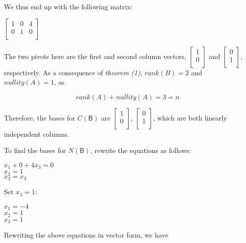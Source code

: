 \documentclass[a4paper, 11pt]{article}
\newcommand{\mat}[1]{\boldsymbol { \mathsf{#1}} }
\begin{document}
\begin{enumerate}
We thus end up with the following matrix:

\begin{center}
	$
	\begin{bmatrix}
	1 & 0 & 4 \\
	0 & 1 & 0 \\
	\end{bmatrix}
	$
\end{center}

The two pivots here are the first and second column vectors, $\begin{bmatrix}
1 \\
0 \\
\end{bmatrix}$ and $\begin{bmatrix}
0 \\
1 \\
\end{bmatrix}$, respectively. As a consequence of \textit{theorem (1)}, $rank(B) = 2$ and $nullity(A) = 1$, as 

\begin{equation*}
    rank(A) + nullity(A) = 3 = n
\end{equation*}

Therefore, the bases for $C(\mat{B})$ are $\begin{bmatrix}
1 \\
0 \\
\end{bmatrix}$, $\begin{bmatrix}
0 \\
1 \\
\end{bmatrix}$, which are both linearly independent columns.

To find the bases for $N(\mat{B})$, rewrite the equations as follows:
\begin{center}
    $x_1 + 0 + 4x_3 = 0$ \\
    $x_2 = 1$ \\
    $x_3 = x_3$ \\
\end{center}

Set $x_3 = 1$:

\begin{center}
    $x_1  = -4$ \\
    $x_2 = 1$ \\
    $x_3 = 1$ \\
\end{center}


Rewriting the above equations in vector form, we have


\end{enumerate}
\end{document}

